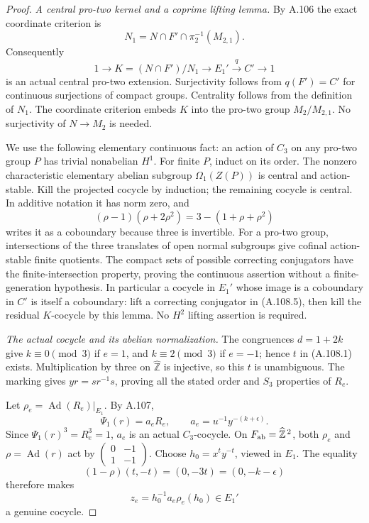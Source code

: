 \begin{proof}
\emph{A central pro-two kernel and a coprime lifting lemma.}
By A.106 the exact coordinate criterion is
\[
 N_1=N\cap F'\cap\pi_2^{-1}(M_{2,1}).
\]
Consequently
\[
 1\longrightarrow K=(N\cap F')/N_1
 \longrightarrow E_1'\xrightarrow{q}C'\longrightarrow1
 \tag{A.108.5}
\]
is an actual central pro-two extension.
Surjectivity follows from \(q(F')=C'\) for continuous surjections
of compact groups. Centrality follows from the definition of \(N_1\).
The coordinate criterion embeds \(K\) into the pro-two group
\(M_2/M_{2,1}\). No surjectivity of \(N\to M_2\) is needed.

We use the following elementary continuous fact: an action of
\(C_3\) on any pro-two group \(P\) has trivial nonabelian \(H^1\).
For finite \(P\), induct on its order. The nonzero characteristic
elementary abelian subgroup \(\Omega_1(Z(P))\) is central and
action-stable. Kill the projected cocycle by induction; the remaining
cocycle is central. In additive notation it has norm zero, and
\[
 (\rho-1)(\rho+2\rho^2)=3-(1+\rho+\rho^2)
 \tag{A.108.6}
\]
writes it as a coboundary because three is invertible.
For a pro-two group, intersections of the three translates of
open normal subgroups give cofinal action-stable finite quotients.
The compact sets of possible correcting conjugators have the
finite-intersection property, proving the continuous assertion
without a finite-generation hypothesis.
In particular a cocycle in \(E_1'\) whose image is a coboundary in
\(C'\) is itself a coboundary: lift a correcting conjugator in
(A.108.5), then kill the residual \(K\)-cocycle by this lemma.
No \(H^2\) lifting assertion is required.

\emph{The actual cocycle and its abelian normalization.}
The congruences \(d=1+2k\) give \(k\equiv0\pmod3\) if \(e=1\),
and \(k\equiv2\pmod3\) if \(e=-1\); hence \(t\) in (A.108.1)
exists. Multiplication by three on \(\widehat{\mathbb Z}\) is
injective, so this \(t\) is unambiguous.
The marking gives \(yr=sr^{-1}s\), proving all the stated
order and \(S_3\) properties of \(R_e\).

Let \(\rho_e=\operatorname{Ad}(R_e)|_{E_1}\). By A.107,
\[
 \Psi_1(r)=a_eR_e,\qquad
 a_e=u^{-1}y^{-(k+\epsilon)}.
 \tag{A.108.7}
\]
Since \(\Psi_1(r)^3=R_e^3=1\), \(a_e\) is an actual \(C_3\)-cocycle.
On \(F_{\rm ab}=\widehat{\mathbb Z}^{\,2}\), both \(\rho_e\) and
\(\rho=\operatorname{Ad}(r)\) act by
\(\left(\begin{smallmatrix}0&-1\\1&-1\end{smallmatrix}\right)\).
Choose \(h_0=x^t y^{-t}\), viewed in \(E_1\). The equality
\[
 (1-\rho)(t,-t)=(0,-3t)=(0,-k-\epsilon)
\]
therefore makes
\[
 z_e=h_0^{-1}a_e\rho_e(h_0)\in E_1'
 \tag{A.108.8}
\]
a genuine cocycle.


\end{proof}
